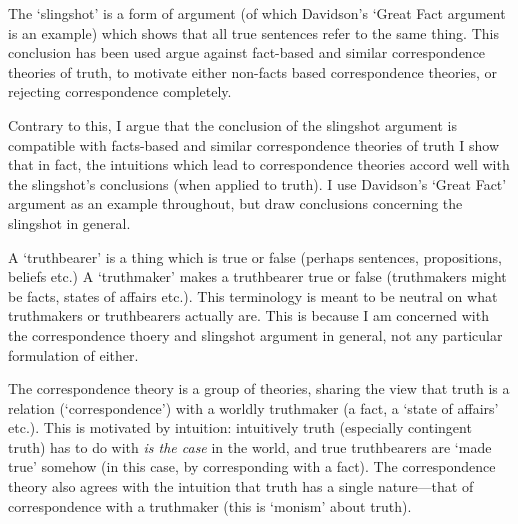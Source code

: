 


The `slingshot' is a form of argument (of which Davidson's `Great Fact argument is an example) which shows that all true sentences refer to the same thing.
This conclusion has been used argue against fact-based and similar correspondence theories of truth, to motivate either non-facts based correspondence theories, or rejecting correspondence completely.

Contrary to this, I argue that the conclusion of the slingshot argument is compatible with facts-based and similar correspondence theories of truth
I show that in fact, the intuitions which lead to correspondence theories accord well with the slingshot's conclusions (when applied to truth).
I use Davidson's `Great Fact' argument as an example throughout, but draw conclusions concerning the slingshot in general.

A `truthbearer' is a thing which is true or false (perhaps sentences, propositions, beliefs etc.)
A `truthmaker' makes a truthbearer true or false (truthmakers might be facts, states of affairs etc.).
This terminology is meant to be neutral on what truthmakers or truthbearers actually are.
This is because I am concerned with the correspondence thoery and slingshot argument in general, not any particular formulation of either.

The correspondence theory is a group of theories, sharing the view that truth is a relation (`correspondence') with a worldly truthmaker (a fact, a `state of affairs' etc.).
This is motivated by intuition: intuitively truth  (especially contingent truth) has to do with \emph{is the case} in the world, and true truthbearers are `made true' somehow (in this case, by corresponding with a fact).
The correspondence theory also agrees with the intuition that truth has a single nature---that of correspondence with a truthmaker (this is `monism' about truth).

